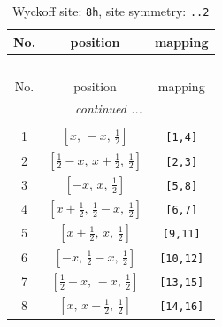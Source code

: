\documentclass[fleqn,8pt]{jsarticle}
\begin{document}
\begin{longtable}{ccc}
\caption{Wyckoff site: {\tt 8h}, site symmetry: {\tt ..2}}
 \\
 \hline \hline
No. & position & mapping \\ \hline \endfirsthead

\multicolumn{2}{l}{\tablename\ \thetable{}} \\
 \hline \hline
No. & position & mapping \\ \hline \endhead

 \hline \hline
\multicolumn{2}{r}{\footnotesize\it continued ...} \\ \endfoot

 \hline \hline
\multicolumn{2}{r}{} \\ \endlastfoot

1 & $\left[ x,\, - x,\, \frac{1}{2} \right]$ & {\tt [1,4]} \\ \hline
2 & $\left[ \frac{1}{2} - x,\, x + \frac{1}{2},\, \frac{1}{2} \right]$ & {\tt [2,3]} \\ \hline
3 & $\left[ - x,\, x,\, \frac{1}{2} \right]$ & {\tt [5,8]} \\ \hline
4 & $\left[ x + \frac{1}{2},\, \frac{1}{2} - x,\, \frac{1}{2} \right]$ & {\tt [6,7]} \\ \hline
5 & $\left[ x + \frac{1}{2},\, x,\, \frac{1}{2} \right]$ & {\tt [9,11]} \\ \hline
6 & $\left[ - x,\, \frac{1}{2} - x,\, \frac{1}{2} \right]$ & {\tt [10,12]} \\ \hline
7 & $\left[ \frac{1}{2} - x,\, - x,\, \frac{1}{2} \right]$ & {\tt [13,15]} \\ \hline
8 & $\left[ x,\, x + \frac{1}{2},\, \frac{1}{2} \right]$ & {\tt [14,16]} \\
\end{longtable}
\renewcommand{\arraystretch}{1.2}
\end{document}
